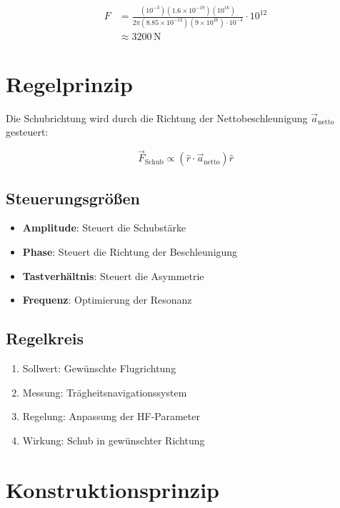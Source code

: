 \documentclass[11pt, a4paper]{article}
\begin{document}
\begin{align*}
F &= \frac{(10^{-3})(1.6 \times 10^{-19})(10^{16})}{2\pi (8.85 \times 10^{-12})(9 \times 10^{16}) \cdot 10^{-4}} \cdot 10^{12} \\
&\approx 3200\,\text{N}
\end{align*}

\section{Regelprinzip}

Die Schubrichtung wird durch die Richtung der Nettobeschleunigung $\vec{a}_{\text{netto}}$ gesteuert:

\begin{equation}
\vec{F}_{\text{Schub}} \propto (\hat{r} \cdot \vec{a}_{\text{netto}}) \hat{r}
\end{equation}

\subsection{Steuerungsgrößen}

\begin{itemize}
    \item \textbf{Amplitude}: Steuert die Schubstärke
    \item \textbf{Phase}: Steuert die Richtung der Beschleunigung
    \item \textbf{Tastverhältnis}: Steuert die Asymmetrie
    \item \textbf{Frequenz}: Optimierung der Resonanz
\end{itemize}

\subsection{Regelkreis}

\begin{enumerate}
    \item Sollwert: Gewünschte Flugrichtung
    \item Messung: Trägheitsnavigationssystem
    \item Regelung: Anpassung der HF-Parameter
    \item Wirkung: Schub in gewünschter Richtung
\end{enumerate}

\newpage
\section{Konstruktionsprinzip}
\end{document}
